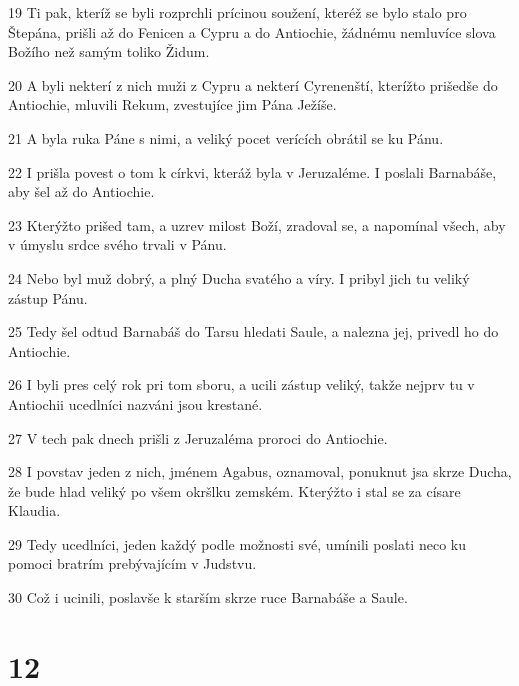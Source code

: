 \par 19 Ti pak, kteríž se byli rozprchli prícinou soužení, kteréž se bylo stalo pro Štepána, prišli až do Fenicen a Cypru a do Antiochie, žádnému nemluvíce slova Božího než samým toliko Židum.
\par 20 A byli nekterí z nich muži z Cypru a nekterí Cyrenenští, kterížto prišedše do Antiochie, mluvili Rekum, zvestujíce jim Pána Ježíše.
\par 21 A byla ruka Páne s nimi, a veliký pocet verících obrátil se ku Pánu.
\par 22 I prišla povest o tom k církvi, kteráž byla v Jeruzaléme. I poslali Barnabáše, aby šel až do Antiochie.
\par 23 Kterýžto prišed tam, a uzrev milost Boží, zradoval se, a napomínal všech, aby v úmyslu srdce svého trvali v Pánu.
\par 24 Nebo byl muž dobrý, a plný Ducha svatého a víry. I pribyl jich tu veliký zástup Pánu.
\par 25 Tedy šel odtud Barnabáš do Tarsu hledati Saule, a nalezna jej, privedl ho do Antiochie.
\par 26 I byli pres celý rok pri tom sboru, a ucili zástup veliký, takže nejprv tu v Antiochii ucedlníci nazváni jsou krestané.
\par 27 V tech pak dnech prišli z Jeruzaléma proroci do Antiochie.
\par 28 I povstav jeden z nich, jménem Agabus, oznamoval, ponuknut jsa skrze Ducha, že bude hlad veliký po všem okršlku zemském. Kterýžto i stal se za císare Klaudia.
\par 29 Tedy ucedlníci, jeden každý podle možnosti své, umínili poslati neco ku pomoci bratrím prebývajícím v Judstvu.
\par 30 Což i ucinili, poslavše k starším skrze ruce Barnabáše a Saule.

\chapter{12}

